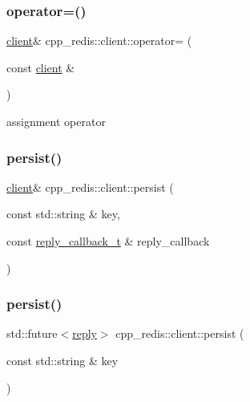 \subsubsection{\texorpdfstring{operator=()}{operator=()}}
{\footnotesize\ttfamily \hyperlink{classcpp__redis_1_1client}{client}\& cpp\+\_\+redis\+::client\+::operator= (\begin{DoxyParamCaption}\item[{const \hyperlink{classcpp__redis_1_1client}{client} \&}]{ }\end{DoxyParamCaption})\hspace{0.3cm}{\ttfamily [delete]}}



assignment operator 

\mbox{\label{classcpp__redis_1_1client_a195c2b896ac8e15c22446a235bf302d4}} 
\subsubsection{\texorpdfstring{persist()}{persist()}\hspace{0.1cm}{\footnotesize\ttfamily [1/2]}}
{\footnotesize\ttfamily \hyperlink{classcpp__redis_1_1client}{client}\& cpp\+\_\+redis\+::client\+::persist (\begin{DoxyParamCaption}\item[{const std\+::string \&}]{key,  }\item[{const \hyperlink{classcpp__redis_1_1client_a061a1140d36d2eaeda82b09a0bb3f9f2}{reply\+\_\+callback\+\_\+t} \&}]{reply\+\_\+callback }\end{DoxyParamCaption})}

\mbox{\label{classcpp__redis_1_1client_a9243adf2ff2989cf1cb4de4ce1be1511}} 
\subsubsection{\texorpdfstring{persist()}{persist()}\hspace{0.1cm}{\footnotesize\ttfamily [2/2]}}
{\footnotesize\ttfamily std\+::future$<$\hyperlink{classcpp__redis_1_1reply}{reply}$>$ cpp\+\_\+redis\+::client\+::persist (\begin{DoxyParamCaption}\item[{const std\+::string \&}]{key }\end{DoxyParamCaption})}

